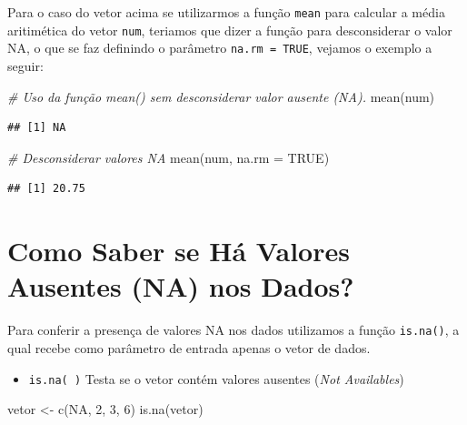 \documentclass[
]{article}
\newenvironment{Shaded}{\begin{snugshade}}{\end{snugshade}}
\newcommand{\AttributeTok}[1]{\textcolor[rgb]{0.77,0.63,0.00}{#1}}
\newcommand{\CommentTok}[1]{\textcolor[rgb]{0.56,0.35,0.01}{\textit{#1}}}
\newcommand{\ConstantTok}[1]{\textcolor[rgb]{0.00,0.00,0.00}{#1}}
\newcommand{\DecValTok}[1]{\textcolor[rgb]{0.00,0.00,0.81}{#1}}
\newcommand{\FunctionTok}[1]{\textcolor[rgb]{0.00,0.00,0.00}{#1}}
\newcommand{\NormalTok}[1]{#1}
\newcommand{\OtherTok}[1]{\textcolor[rgb]{0.56,0.35,0.01}{#1}}
\providecommand{\tightlist}{%
  \setlength{\itemsep}{0pt}\setlength{\parskip}{0pt}}
\begin{document}
Para o caso do vetor acima se utilizarmos a função \texttt{mean} para
calcular a média aritimética do vetor \texttt{num}, teriamos que dizer a
função para desconsiderar o valor NA, o que se faz definindo o parâmetro
\texttt{na.rm\ =\ TRUE}, vejamos o exemplo a seguir:

\begin{Shaded}
\begin{Highlighting}[]
\CommentTok{\# Uso da função mean() sem desconsiderar valor ausente (NA).}
\FunctionTok{mean}\NormalTok{(num)}
\end{Highlighting}
\end{Shaded}

\begin{verbatim}
## [1] NA
\end{verbatim}

\begin{Shaded}
\begin{Highlighting}[]
\CommentTok{\# Desconsiderar valores NA}
\FunctionTok{mean}\NormalTok{(num, }\AttributeTok{na.rm =} \ConstantTok{TRUE}\NormalTok{)}
\end{Highlighting}
\end{Shaded}

\begin{verbatim}
## [1] 20.75
\end{verbatim}

\hypertarget{como-saber-se-huxe1-valores-ausentes-na-nos-dados}{%
\section{Como Saber se Há Valores Ausentes (NA) nos
Dados?}\label{como-saber-se-huxe1-valores-ausentes-na-nos-dados}}

Para conferir a presença de valores NA nos dados utilizamos a função
\texttt{is.na()}, a qual recebe como parâmetro de entrada apenas o vetor
de dados.

\begin{itemize}
\tightlist
\item
  \texttt{is.na(\ )} Testa se o vetor contém valores ausentes (\emph{Not
  Availables})
\end{itemize}

\begin{Shaded}
\begin{Highlighting}[]
\NormalTok{vetor }\OtherTok{\textless{}{-}} \FunctionTok{c}\NormalTok{(}\ConstantTok{NA}\NormalTok{, }\DecValTok{2}\NormalTok{, }\DecValTok{3}\NormalTok{, }\DecValTok{6}\NormalTok{)}
\FunctionTok{is.na}\NormalTok{(vetor)}
\end{Highlighting}
\end{Shaded}
\end{document}
